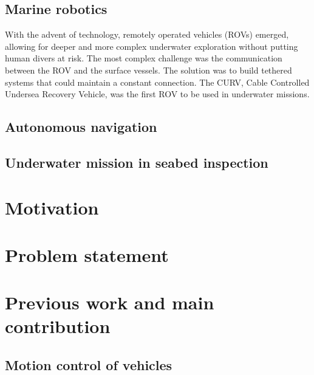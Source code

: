\subsection{Marine robotics}
With the advent of technology, remotely operated vehicles (ROVs) emerged, allowing for deeper and more complex underwater exploration without putting human divers at risk. The most complex challenge was the communication between the ROV and the surface vessels. The solution was to build tethered systems that could maintain a constant connection.
The CURV, Cable Controlled Undersea Recovery Vehicle, was the first ROV to be used in underwater missions.


\subsection{Autonomous navigation}
\subsection{Underwater mission in seabed inspection}

\section{Motivation}
\section{Problem statement}

\section{Previous work and main contribution}
\subsection{Motion control of vehicles}

